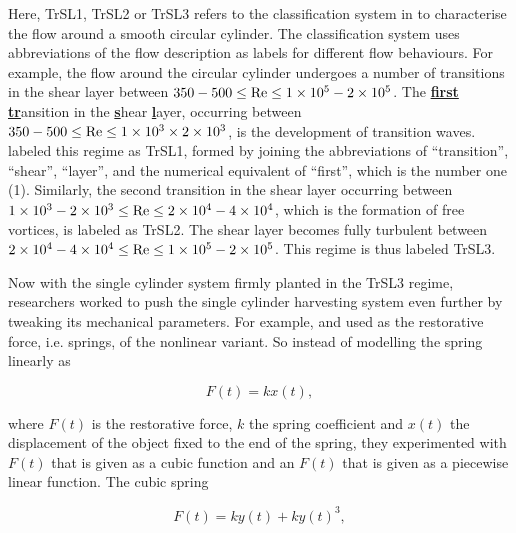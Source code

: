 \documentclass[oneside]{utmthesis}
\begin{document}
Here, TrSL1, TrSL2 or TrSL3 refers to the classification system in \citet{Zdravkovich1997} to characterise the flow around a smooth circular cylinder. The classification system uses abbreviations of the flow description as labels for different flow behaviours. For example, the flow around the circular cylinder undergoes a number of transitions in the shear layer between $350 - 500 \leq \text{Re} \leq 1 \times 10^{5} - 2 \times 10^{5}$. The \underline{\textbf{first}} \underline{\textbf{tr}}ansition in the \underline{\textbf{s}}hear \underline{\textbf{l}}ayer, occurring between $350 - 500 \leq \text{Re} \leq 1 \times 10^{3} \times 2 \times 10^{3}$, is the development of transition waves. \citet{Zdravkovich1997} labeled this regime as TrSL1, formed by joining the abbreviations of ``transition'', ``shear'', ``layer'', and the numerical equivalent of ``first'', which is the number one (1). Similarly, the second transition in the shear layer occurring between $1 \times 10^{3} - 2 \times 10^{3} \leq \text{Re} \leq 2 \times 10^{4} - 4 \times 10^{4}$, which is the formation of free vortices, is labeled as TrSL2. The shear layer becomes fully turbulent between $2 \times 10^{4} - 4 \times 10^{4} \leq \text{Re} \leq 1 \times 10^{5} - 2 \times 10^{5}$. This regime is thus labeled TrSL3. 

Now with the single cylinder system firmly planted in the TrSL3 regime, researchers worked to push the single cylinder harvesting system even further by tweaking its mechanical parameters. For example, \citet{Sun2018} and \citet{Ma2018} used as the restorative force, i.e. springs, of the nonlinear variant. So instead of modelling the spring linearly as

\begin{equation}
  F(t) = k x(t),
  \label{eq:linearSpring}
\end{equation}

\noindent where $F(t)$ is the restorative force, $k$ the spring coefficient and $x(t)$ the displacement of the object fixed to the end of the spring, they experimented with $F(t)$ that is given as a cubic function and an $F(t)$ that is given as a piecewise linear function. The cubic spring

\begin{equation}
  F(t) = k y(t) + k y(t)^{3},
  \label{eq:cubicSpring}
\end{equation}
\end{document}
